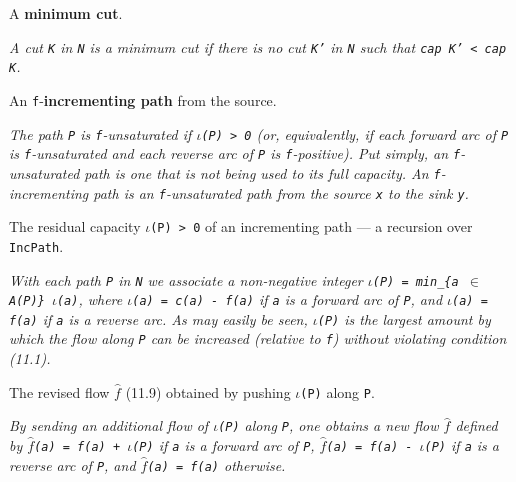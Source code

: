 \begin{definition}
\label{Networks.Network.IsMinCut}
\leanok
{}
A \textbf{minimum cut}.

\emph{A cut \texttt{K} in \texttt{N} is a minimum cut if
there is no cut \texttt{K'} in \texttt{N} such that \texttt{cap K' < cap K}.}
\end{definition}

\begin{definition}
\label{Networks.Network.IncPath}
\leanok
{}
An \texttt{f}-\textbf{incrementing path} from the source.

\emph{The path \texttt{P} is \texttt{f}-unsaturated if \texttt{$\iota$(P) > 0} (or,
equivalently, if each forward arc of \texttt{P} is \texttt{f}-unsaturated and each
reverse arc of
\texttt{P} is \texttt{f}-positive).  Put simply, an \texttt{f}-unsaturated path is one that is not being
used to its full capacity. An \texttt{f}-incrementing path is an \texttt{f}-unsaturated
path
from the source \texttt{x} to the sink \texttt{y}.}
\end{definition}

\begin{definition}
\label{Networks.Network.IncPath.iota}
The residual capacity \texttt{$\iota$(P) > 0} of an incrementing path --- a recursion
over \texttt{IncPath}.

\emph{With each path \texttt{P} in \texttt{N} we associate a
non-negative integer \texttt{$\iota$(P) = min\_\{a $\in$ A(P)\} $\iota$(a)}, where
\texttt{$\iota$(a) = c(a) - f(a)} if
\texttt{a} is a forward arc of \texttt{P}, and \texttt{$\iota$(a) = f(a)} if \texttt{a} is a reverse arc.  As may
easily be seen, \texttt{$\iota$(P)} is the largest amount by which the flow along
\texttt{P} can be
increased (relative to \texttt{f}) without violating condition (11.1).}
\end{definition}

\begin{definition}
\label{Networks.Network.revisedFlow}
The revised flow \texttt{$\hat{f}$} (11.9) obtained by pushing \texttt{$\iota$(P)} along
\texttt{P}.

\emph{By sending an additional flow of \texttt{$\iota$(P)} along
\texttt{P}, one obtains a new flow \texttt{$\hat{f}$} defined by \texttt{$\hat{f}$(a) = f(a) + $\iota$(P)} if \texttt{a} is a
forward arc of \texttt{P}, \texttt{$\hat{f}$(a) = f(a) - $\iota$(P)} if \texttt{a} is a
reverse arc of \texttt{P}, and
\texttt{$\hat{f}$(a) = f(a)} otherwise.}
\end{definition}

